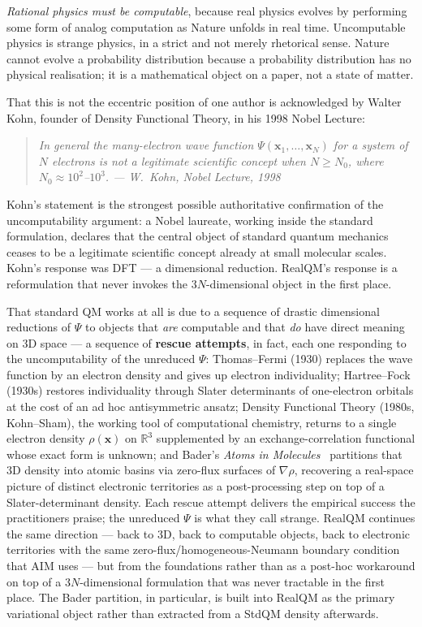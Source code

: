 \emph{Rational physics must be computable}, because real physics evolves by performing some form of analog computation as Nature unfolds in real time. Uncomputable physics is strange physics, in a strict and not merely rhetorical sense. Nature cannot evolve a probability distribution because a probability distribution has no physical realisation; it is a mathematical object on a paper, not a state of matter.

That this is not the eccentric position of one author is acknowledged by Walter Kohn, founder of Density Functional Theory, in his 1998 Nobel Lecture:

\begin{quote}
\itshape In general the many-electron wave function $\Psi(\mathbf{x}_1, \ldots, \mathbf{x}_N)$ for a system of $N$ electrons is not a legitimate scientific concept when $N \geq N_0$, where $N_0 \approx 10^2$--$10^3$. \normalfont\hfill --- W.~Kohn, Nobel Lecture, 1998
\end{quote}

Kohn's statement is the strongest possible authoritative confirmation of the uncomputability argument: a Nobel laureate, working inside the standard formulation, declares that the central object of standard quantum mechanics ceases to be a legitimate scientific concept already at small molecular scales. Kohn's response was DFT --- a dimensional reduction. RealQM's response is a reformulation that never invokes the $3N$-dimensional object in the first place.

That standard QM works at all is due to a sequence of drastic dimensional reductions of $\Psi$ to objects that \emph{are} computable and that \emph{do} have direct meaning on 3D space --- a sequence of \textbf{rescue attempts}, in fact, each one responding to the uncomputability of the unreduced $\Psi$: Thomas--Fermi (1930) replaces the wave function by an electron density and gives up electron individuality; Hartree--Fock (1930s) restores individuality through Slater determinants of one-electron orbitals at the cost of an ad hoc antisymmetric ansatz; Density Functional Theory (1980s, Kohn--Sham), the working tool of computational chemistry, returns to a single electron density $\rho(\mathbf{x})$ on $\mathbb{R}^3$ supplemented by an exchange-correlation functional whose exact form is unknown; and Bader's \emph{Atoms in Molecules}~\cite{Bader90} partitions that 3D density into atomic basins via zero-flux surfaces of $\nabla\rho$, recovering a real-space picture of distinct electronic territories as a post-processing step on top of a Slater-determinant density. Each rescue attempt delivers the empirical success the practitioners praise; the unreduced $\Psi$ is what they call strange. RealQM continues the same direction --- back to 3D, back to computable objects, back to electronic territories with the same zero-flux/homogeneous-Neumann boundary condition that AIM uses --- but from the foundations rather than as a post-hoc workaround on top of a $3N$-dimensional formulation that was never tractable in the first place. The Bader partition, in particular, is built into RealQM as the primary variational object rather than extracted from a StdQM density afterwards.

